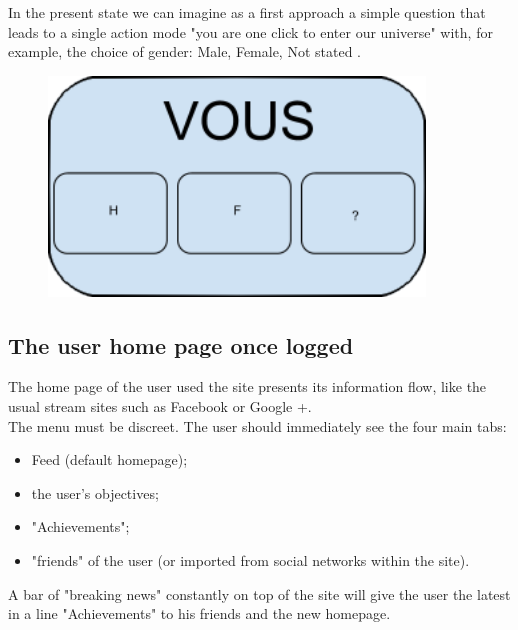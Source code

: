 \documentclass{life-fr}
\begin{document}
In the present state we can imagine as a first approach a simple question that leads to a single action mode "you are one click to enter our universe" with, for example, the choice of gender: Male, Female, Not stated .

\begin{figure}[H]
  \begin{center}
    \includegraphics[width=10cm]{img/vous.png}
  \end{center}
\end{figure}

\newpage

\subsection{The user home page once logged}

The home page of the user used the site presents its information flow, like the usual stream sites such as Facebook or Google +. \\

The menu must be discreet. The user should immediately see the four main tabs:

\begin{itemize}
  \item Feed (default homepage);
  \item the user's objectives;
  \item "Achievements";
  \item "friends" of the user (or imported from social networks within the site).
\end{itemize}

A bar of "breaking news" constantly on top of the site will give the user the latest in a line "Achievements" to his friends and the new homepage.
\end{document}

